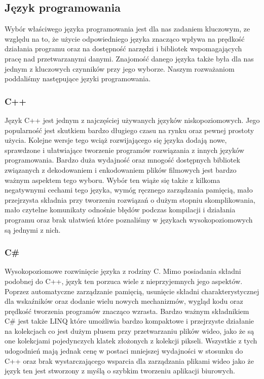 \documentclass[twoside]{projektInzynierskiMS}
\begin{document}
\subsection{Język programowania}

Wybór właściwego języka programowania jest dla nas zadaniem kluczowym, ze względu na to, że użycie odpowiedniego języka znacząco wpływa na prędkość działania programu oraz na dostępność narzędzi i bibliotek wspomagających pracę nad przetwarzanymi danymi. Znajomość danego języka także była dla nas jednym z kluczowych czynników przy jego wyborze. Naszym rozważaniom poddaliśmy następujące języki programowania.

\subsubsection{C++}
Język C++ jest jednym z najczęściej używanych języków niskopoziomowych. Jego popularność jest skutkiem bardzo długiego czasu na rynku oraz pewnej prostoty użycia. Kolejne wersje tego wciąż rozwijającego się języka dodają nowe, sprawdzone i ułatwiające tworzenie programów rozwiązania z innych języków programowania. Bardzo duża wydajność oraz mnogość dostępnych bibliotek związanych z dekodowaniem i enkodowaniem plików filmowych jest bardzo ważnym aspektem tego wyboru. Wybór ten wiąże się także z kilkoma negatywnymi cechami tego języka, wymóg ręcznego zarządzania pamięcią, mało przejrzysta składnia przy tworzeniu rozwiązań o dużym stopniu skomplikowania, mało czytelne komunikaty odnośnie błędów podczas kompilacji i działania programu oraz brak ułatwień które poznaliśmy w językach wysokopoziomowych są jednymi z nich. 

\subsubsection{C\#}
Wysokopoziomowe rozwinięcie języka z rodziny C. Mimo posiadania składni podobnej do C++, język ten porzuca wiele z nieprzyjemnych jego aspektów. Poprzez automatyczne zarządzanie pamięcią, usunięcie składni charakterystycznej dla wskaźników oraz dodanie wielu nowych mechanizmów, wygląd kodu oraz prędkość tworzenia programów znacząco wzrasta. Bardzo ważnym składnikiem C\# jest także LINQ które umożliwia bardzo kompaktowe i przejrzyste działanie na kolekcjach co jest dużym plusem przy przetwarzaniu plików wideo, jako że są one kolekcjami pojedynczych klatek złożonych z kolekcji pikseli. Wszystkie z tych udogodnień mają jednak cenę w postaci mniejszej wydajności w stosunku do C++ oraz brak wystarczającego wsparcia dla zarządzania plikami wideo jako że język ten jest stworzony z myślą o szybkim tworzeniu aplikacji biurowych. 
\end{document}
